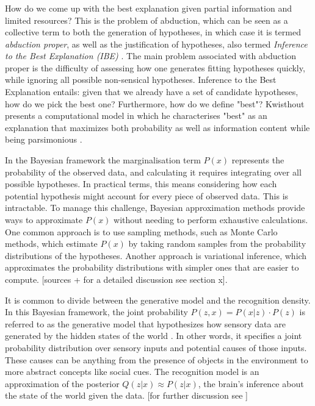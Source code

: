 \subsubsection{}
How do we come up with the best explanation given partial information and limited resources? This is the problem of abduction, which can be seen as a collective term to both the generation of hypotheses, in which case it is termed \textit{abduction proper}, as well as the justification of hypotheses, also termed \textit{Inference to the Best Explanation (IBE)} \cite{burks1946peirce}.
The main problem associated with abduction proper is the difficulty of assessing how one generates fitting hypotheses quickly, while ignoring all possible non-sensical hypotheses.
Inference to the Best Explanation entails: given that we already have a set of candidate hypotheses, how do we pick the best one? Furthermore, how do we define "best"? Kwisthout presents a computational model in which he characterises "best" as an explanation that maximizes both probability as well as information content while being parsimonious \cite{kwisthout2013most}.

In the Bayesian framework the marginalisation term \( P(x) \) represents the probability of the observed data, and calculating it requires integrating over all possible hypotheses. In practical terms, this means considering how each potential hypothesis might account for every piece of observed data. This is intractable. To manage this challenge, Bayesian approximation methods provide ways to approximate \( P(x) \) without needing to perform exhaustive calculations. One common approach is to use sampling methods, such as Monte Carlo methods, which estimate 
\( P(x) \) by taking random samples from the probability distributions of the hypotheses. Another approach is variational inference, which approximates the probability distributions with simpler ones that are easier to compute. [sources + for a detailed discussion see section x]. 

It is common to divide between the generative model and the recognition density.
In this Bayesian framework, the joint probability \( P(z, x) = P(x \vert z) \cdot P(z) \) is referred to as the generative model that hypothesizes how sensory data are generated by the hidden states of the world \cite{Ramstead_Kirchhoff_Friston_2020}. In other words, it specifies a joint probability distribution over sensory inputs and potential causes of those inputs. These causes can be anything from the presence of objects in the environment to more abstract concepts like social cues.
The recognition model is an approximation of the posterior \(Q(z \vert x) \approx P(z \vert x) \), the brain's inference about the state of the world given the data.
[for further discussion see ]

